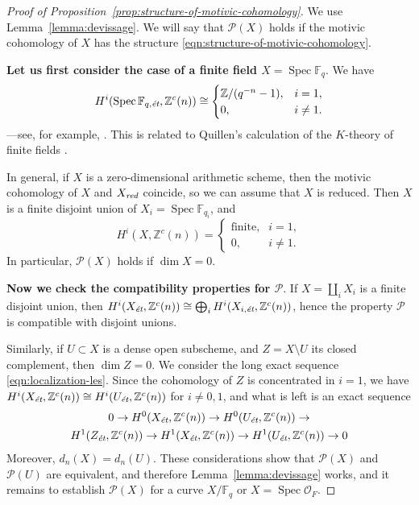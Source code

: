 \documentclass[draft]{article}
\DeclareMathOperator{\Spec}{Spec}
\newcommand{\FF}{\mathbb{F}}
\newcommand{\ZZ}{\mathbb{Z}}
\newcommand{\et}{\text{\it \'{e}t}}
\newcommand{\red}{\text{\it red}}
\theoremstyle{myplain}
\theoremstyle{mydefinition}
\begin{document}
\begin{proof}[Proof of Proposition~\ref{prop:structure-of-motivic-cohomology}]
  We use Lemma~\ref{lemma:devissage}. We will say that $\mathcal{P} (X)$ holds
  if the motivic cohomology of $X$ has the structure
  \eqref{eqn:structure-of-motivic-cohomology}.

  \vspace{1em}

  \textbf{Let us first consider the case of a finite field $X = \Spec \FF_q$}.
  We have
  \begin{equation}
    \label{eqn:motivic-cohomology-finite-fields}
    H^i (\Spec \FF_{q,\et}, \ZZ^c (n)) \cong
    \begin{cases}
      \ZZ/(q^{-n} - 1), & i = 1, \\
      0, & i \ne 1.
    \end{cases}
  \end{equation}
  ---see, for example, \cite[Example~4.2]{Geisser-2017}. This is related to
  Quillen's calculation of the $K$-theory of finite fields \cite{Quillen-1972}.

  In general, if $X$ is a zero-dimensional arithmetic scheme, then the motivic
  cohomology of $X$ and $X_\red$ coincide, so we can assume that $X$ is
  reduced. Then $X$ is a finite disjoint union of $X_i = \Spec \FF_{q_i}$, and
  \begin{equation}
    H^i (X, \ZZ^c (n)) = \begin{cases}
      \text{finite}, & i = 1, \\
      0, & i \ne 1.
    \end{cases}
  \end{equation}
  In particular, $\mathcal{P} (X)$ holds if $\dim X = 0$.

  \vspace{1em}

  \textbf{Now we check the compatibility properties for $\mathcal{P}$}.
  If $X = \coprod_i X_i$ is a finite disjoint union, then
  $H^i (X_\et, \ZZ^c (n)) \cong \bigoplus_i H^i (X_{i,\et}, \ZZ^c (n))$,
  hence the property $\mathcal{P}$ is compatible with disjoint unions.

  Similarly, if $U \subset X$ is a dense open subscheme, and $Z = X\setminus U$
  its closed complement, then $\dim Z = 0$. We consider the long exact sequence
  \eqref{eqn:localization-les}. Since the cohomology of $Z$ is concentrated in
  $i = 1$, we have $H^i (X_\et, \ZZ^c (n)) \cong H^i (U_\et, \ZZ^c (n))$ for
  $i \ne 0,1$, and what is left is an exact sequence
  \begin{multline*}
    0 \to H^0 (X_\et, \ZZ^c (n)) \to
    H^0 (U_\et, \ZZ^c (n)) \to \\
    H^1 (Z_\et, \ZZ^c (n)) \to
    H^1 (X_\et, \ZZ^c (n)) \to
    H^1 (U_\et, \ZZ^c (n)) \to 0
  \end{multline*}
  Moreover, $d_n (X) = d_n (U)$. These considerations show that
  $\mathcal{P} (X)$ and $\mathcal{P} (U)$ are equivalent, and therefore
  Lemma~\ref{lemma:devissage} works, and it remains to establish
  $\mathcal{P} (X)$ for a curve $X/\FF_q$ or $X = \Spec \mathcal{O}_F$.


\end{proof}
\end{document}
